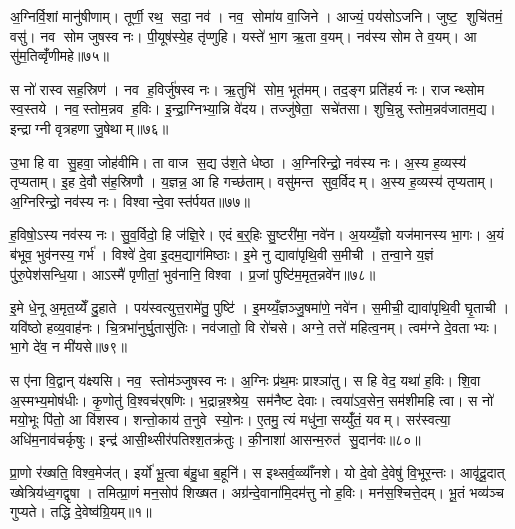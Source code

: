 अ॒ग्निर्वि॒शां मानु॑षीणाम्। तूर्णी॒ रथ॒ सदा॒ नव॑। नव॒ सोमा॑य वा॒जिने। आज्यं॒ पय॑सोऽजनि। जुष्ट॒ शुचि॑तमं॒ वसु॑। नव सोम जुषस्व नः। पी॒यूष॑स्ये॒ह तृ॑प्णुहि। यस्ते॑ भा॒ग ऋ॒ता व॒यम्। नव॑स्य सोम ते व॒यम्। आ सु॑म॒तिव्वृँ॑णीमहे॥७५॥

स नो॑ रास्व सह॒स्रिण॑। नव ह॒विर्जु॑षस्व नः। ऋ॒तुभि॑ सोम॒ भूत॑मम्। तद॒ङ्ग प्रति॑हर्य नः। राजन्थ्सोम स्व॒स्तये। नव॒स्तोम॒न्नव ह॒विः। इ॒न्द्रा॒ग्निभ्या॒न्नि वे॑दय। तज्जु॑षेता॒ सचे॑तसा। शुचि॒न्नु स्तोम॒न्नव॑जातम॒द्य। इन्द्राग्नी वृत्रहणा जु॒षेथाम्॥७६॥

उ॒भा हि वा सु॒हवा॒ जोह॑वीमि। ता वाज स॒द्य उ॑श॒ते धेष्ठा। अ॒ग्निरिन्द्रो॒ नव॑स्य नः। अ॒स्य ह॒व्यस्य॑ तृप्यताम्। इ॒ह दे॒वौ स॑ह॒स्रिणौ। य॒ज्ञन्न॒ आ हि गच्छ॑ताम्। वसु॑मन्त सुव॒र्विदम्। अ॒स्य ह॒व्यस्य॑ तृप्यताम्। अ॒ग्निरिन्द्रो॒ नव॑स्य नः। विश्वान्दे॒वास्त॑र्पयत॥७७॥

ह॒विषो॒ऽस्य नव॑स्य नः। सु॒व॒र्विदो॒ हि ज॑ज्ञि॒रे। एदं ब॒र्॒हिः सु॒ष्टरी॑मा॒ नवे॑न। अ॒यय्यँ॒ज्ञो यज॑मानस्य भा॒गः। अ॒यं ब॑भूव॒ भुव॑नस्य॒ गर्भ॑। विश्वे॑ दे॒वा इ॒दम॒द्याग॑मिष्ठाः। इ॒मे नु द्यावा॑पृथि॒वी स॒मीची। त॒न्वा॒ने य॒ज्ञं पु॑रु॒पेश॑सन्धि॒या। आऽस्मै॑ पृणीतां॒ भुव॑नानि॒ विश्वा। प्र॒जां पुष्टि॑म॒मृत॒न्नवे॑न॥७८॥

इ॒मे धे॒नू अ॒मृत॒य्येँ दु॒हाते। पय॑स्वत्युत्त॒रामे॑तु॒ पुष्टि॑। इ॒मय्यँ॒ज्ञञ्जु॒षमा॑णे॒ नवे॑न। स॒मीची॒ द्यावा॑पृथि॒वी घृ॒ताची। यवि॑ष्ठो हव्य॒वाह॑नः। चि॒त्रभा॑नुर्घु॒तासु॑तिः। नव॑जातो॒ वि रो॑चसे। अग्ने॒ तत्ते॑ महित्व॒नम्। त्वम॑ग्ने दे॒वताभ्यः। भा॒गे दे॑व॒ न मी॑यसे॥७९॥

स ए॑ना वि॒द्वान् य॑क्ष्यसि। नव॒ स्तोम॑ञ्जुषस्व नः। अ॒ग्निः प्र॑थ॒मः प्राश्ञा॑तु। स हि वेद॒ यथा॑ ह॒विः। शि॒वा अ॒स्मभ्य॒मोष॑धीः। कृ॒णोतु॑ वि॒श्वच॑र्‌षणिः। भ॒द्रान्न॒श्श्रेय॒ सम॑नैष्ट देवाः। त्वया॑ऽव॒सेन॒ सम॑शीमहि त्वा। स नो॑ मयो॒भूः पि॑तो॒ आ वि॑शस्व। शन्तो॒काय॑ त॒नुवे स्यो॒नः। ए॒तमु॒ त्यं मधु॑ना॒ सय्युँ॑तं॒ यवम्। सर॑स्वत्या॒ अधि॑म॒नाव॑चर्कृषुः। इन्द्र॑ आसी॒थ्सीर॑पतिश्श॒तक्र॑तुः। की॒नाशा॑ आसन्म॒रुत॑ सु॒दान॑वः॥८०॥



\clearpage
{}
\setcounter{anuvakam}{0}
प्रा॒णो र॑ख्षति॒ विश्व॒मेज॑त्। इर्यो॑ भू॒त्वा ब॑हु॒धा ब॒हूनि॑। स इथ्सर्व॒व्व्याँ॑नशे। यो दे॒वो दे॒वेषु॑ वि॒भूर॒न्तः। आवृ॑दू॒दात् ख्षेत्रिय॑ध्व॒गद्वृषा। तमित्प्रा॒णं मन॒सोप॑ शिख्षत। अग्र॑न्दे॒वाना॑मि॒दम॑त्तु नो ह॒विः। मन॑स॒श्चित्ते॒दम्। भू॒तं भव्य॑ञ्च गुप्यते। तद्धि दे॒वेष्व॑ग्रि॒यम्॥१॥

